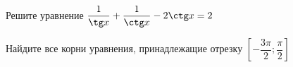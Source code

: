 \begin{ex}
	\begin{condition}
		\begin{enumcols}[label=\asbuk*)]
			\item Решите уравнение \( \dfrac{1}{\tg x}+\dfrac{1}{\ctg x}-2\ctg x = 2 \)
			\item Найдите все корни уравнения, принадлежащие отрезку \( \left[-\dfrac{3\pi}{2};\dfrac{\pi}{2}\right] \)
		\end{enumcols}
	\end{condition}
\end{ex}